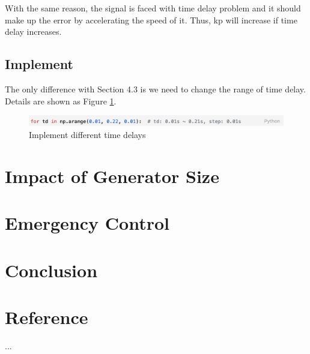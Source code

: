 \documentclass{report}
\begin{document}
With the same reason, the signal is faced with time delay problem and it should make up the error by accelerating the speed of it. Thus, kp will increase if time delay increases. \\

\section{Implement} %
The only difference with Section 4.3 is we need to change the range of time delay. Details are shown as Figure \textcolor{red}{\ref{5_3_code}}. \\

\begin{figure}[htbp]
\centering
\includegraphics[width = .999\textwidth]{figure/5_3_code.png}
\caption{Implement different time delays}
\label{5_3_code}
\end{figure}





\chapter{Impact of Generator Size}
\label{Chapter6}


\chapter{Emergency Control}
\label{Chapter7}


\chapter{Conclusion}
\label{Chapter8}


\appendix
\chapter{Reference}
...


\end{document}
